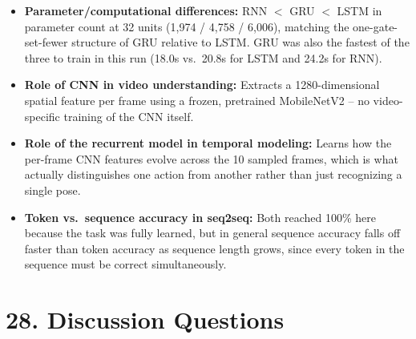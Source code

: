 \documentclass[10pt]{article}
\begin{document}
\begin{itemize}
gated architectures', rather than showing a clean "more context helps"
trend.
\item \textbf{Parameter/computational differences:} RNN $<$ GRU $<$ LSTM in
parameter count at 32 units (1,974 / 4,758 / 6,006), matching the
one-gate-set-fewer structure of GRU relative to LSTM. GRU was also the
fastest of the three to train in this run (18.0s vs.\ 20.8s for LSTM and
24.2s for RNN).
\item \textbf{Role of CNN in video understanding:} Extracts a
1280-dimensional spatial feature per frame using a frozen, pretrained
MobileNetV2 -- no video-specific training of the CNN itself.
\item \textbf{Role of the recurrent model in temporal modeling:} Learns how
the per-frame CNN features evolve across the 10 sampled frames, which is
what actually distinguishes one action from another rather than just
recognizing a single pose.
\item \textbf{Token vs.\ sequence accuracy in seq2seq:} Both reached 100\%
here because the task was fully learned, but in general sequence accuracy
falls off faster than token accuracy as sequence length grows, since every
token in the sequence must be correct simultaneously.
\end{itemize}

\section*{28. Discussion Questions}
\end{document}
